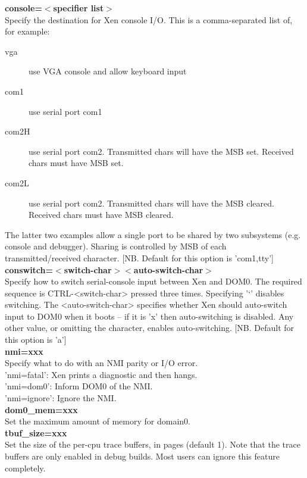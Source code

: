 \documentclass[11pt,twoside,final,openright]{xenstyle}
\begin{document}
{{\bf console=$<$specifier list$>$ } \\
 Specify the destination for Xen console I/O.
 This is a comma-separated list of, for example:
\begin{description}
 \item[vga]  use VGA console and allow keyboard input
 \item[com1] use serial port com1
 \item[com2H] use serial port com2. Transmitted chars will
   have the MSB set. Received chars must have
   MSB set.
 \item[com2L] use serial port com2. Transmitted chars will
   have the MSB cleared. Received chars must
   have MSB cleared.
\end{description}
 The latter two examples allow a single port to be
 shared by two subsystems (e.g. console and
 debugger). Sharing is controlled by MSB of each
 transmitted/received character.
 [NB. Default for this option is 'com1,tty'] \\

{\bf conswitch=$<$switch-char$><$auto-switch-char$>$ } \\
 Specify how to switch serial-console input between
 Xen and DOM0. The required sequence is CTRL-<switch-char>
 pressed three times. Specifying '`' disables switching.
 The <auto-switch-char> specifies whether Xen should
 auto-switch input to DOM0 when it boots -- if it is 'x'
 then auto-switching is disabled.  Any other value, or
 omitting the character, enables auto-switching.
 [NB. Default for this option is 'a'] \\

{\bf nmi=xxx } \\
 Specify what to do with an NMI parity or I/O error. \\
 'nmi=fatal':  Xen prints a diagnostic and then hangs. \\
 'nmi=dom0':   Inform DOM0 of the NMI. \\
 'nmi=ignore': Ignore the NMI. \\

{\bf dom0\_mem=xxx } \\
 Set the maximum amount of memory for domain0. \\

{\bf tbuf\_size=xxx } \\
 Set the size of the per-cpu trace buffers, in pages
 (default 1).  Note that the trace buffers are only
 enabled in debug builds.  Most users can ignore
 this feature completely. \\

}
\end{document}
